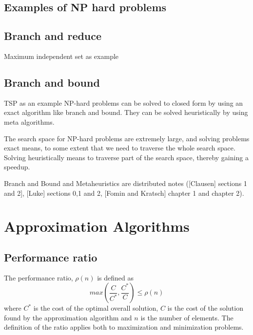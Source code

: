 \documentclass[10pt]{article}
\begin{document}
\subsection{Examples of NP hard problems} %
\label{sub:exmaples_of_np_hard_problems}



\subsection{Branch and reduce} %
\label{sub:branch_and_reduce}
Maximum independent set as example



\subsection{Branch and bound} %
\label{sub:branch_and_bound}
TSP as an example
NP-hard problems can be solved to closed form by using an exact algorithm like branch and bound. They can be solved heuristically by using meta algorithms.

The search space for NP-hard problems are extremely large, and solving problems exact means, to some extent that we need to traverse the whole search space. Solving heuristically means to traverse part of the search space, thereby gaining a speedup.



Branch and Bound and Metaheuristics are  distributed notes ([Clausen] sections 1 and 2], [Luke] sections 0,1 and 2, [Fomin and Kratsch] chapter 1 and chapter 2).                                                                                                                                                          
\clearpage \newpage
\section{Approximation Algorithms} %
\label{sec:approximation_algorithms}


\subsection{Performance ratio} %
\label{sub:performance_ratio}
The performance ratio, $\rho(n)$ is defined as
\begin{equation}
  max(\frac{C}{C^*}, \frac{C^*}{C}) \label{eqapprox0} \leq \rho(n)
\end{equation}
where $C^*$ is the cost of the optimal overall solution, $C$ is the cost of the solution found by the approximation algorithm and $n$ is the number of elements. The definition of the ratio applies both to maximization and minimization problems. 
\end{document}
